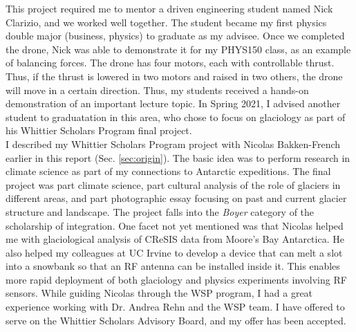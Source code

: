 \documentclass[../../../main.tex]{subfiles}
\begin{document}
This project required me to mentor a driven engineering student named Nick Clarizio, and we worked well together.  The student became my first physics double major (business, physics) to graduate as my advisee.  Once we completed the drone, Nick was able to demonstrate it for my PHYS150 class, as an example of balancing forces.  The drone has four motors, each with controllable thrust.  Thus, if the thrust is lowered in two motors and raised in two others, the drone will move in a certain direction.  Thus, my students received a hands-on demonstration of an important lecture topic.  In Spring 2021, I advised another student to graduatation in this area, who chose to focus on glaciology as part of his Whittier Scholars Program final project.
\\
\vspace{0.15cm}
I described my Whittier Scholars Program project with Nicolas Bakken-French earlier in this report (Sec. \ref{sec:origin}).  The basic idea was to perform research in climate science as part of my connections to Antarctic expeditions.  The final project was part climate science, part cultural analysis of the role of glaciers in different areas, and part photographic essay focusing on past and current glacier structure and landscape.  The project falls into the \textit{Boyer} category of the scholarship of integration.  One facet not yet mentioned was that Nicolas helped me with glaciological analysis of CReSIS data from Moore's Bay Antarctica.  He also helped my colleagues at UC Irvine to develop a device that can melt a slot into a snowbank so that an RF antenna can be installed inside it.  This enables more rapid deployment of both glaciology and physics experiments involving RF sensors.  While guiding Nicolas through the WSP program, I had a great experience working with Dr. Andrea Rehn and the WSP team.  I have offered to serve on the Whittier Scholars Advisory Board, and my offer has been accepted.
\end{document}
